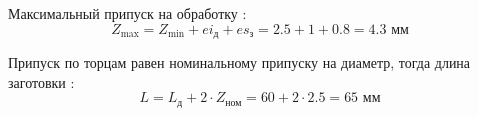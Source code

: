 Максимальный припуск на обработку \cite{metodika}:
\begin{equation}
    Z_\text{max} = Z_\text{min} + ei_\text{д} + es_\text{з} = 2.5 + 1 + 0.8 = 4.3   \text{ мм}
\end{equation}

Припуск по торцам равен номинальному припуску на диаметр, тогда длина заготовки \cite{metodika}:
\begin{equation}
    L = L_\text{д} + 2 \cdot Z_\text{ном} = 60 + 2 \cdot 2.5 = 65   \text{ мм}
\end{equation}

